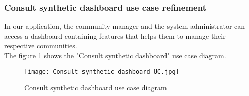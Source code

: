 \begin{table}[H]
\end{table}
\subsubsection{Consult synthetic dashboard use case refinement}
In our application, the community manager and the system administrator can access a dashboard containing features that helps them to manage their respective communities.\\
The figure \ref{dashboard_uc} shows the "Consult synthetic dashboard" use case diagram.
\begin{figure}[H]%
    \center   
    \texttt{[image: Consult synthetic dashboard UC.jpg]}
    \caption{Consult synthetic dashboard use case diagram}
    \label{dashboard_uc}
\end{figure}

